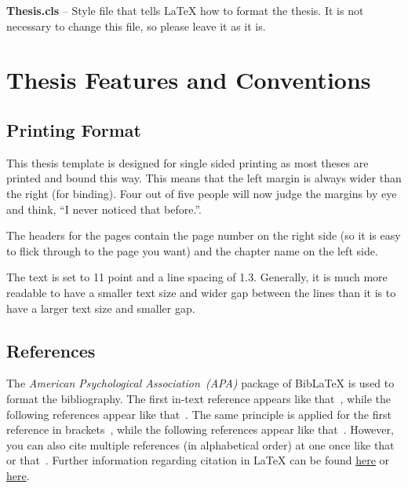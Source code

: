 \textbf{Thesis.cls} -- Style file that tells \LaTeX{} how to format the thesis. It is not necessary to change this file, so please leave it as it is.


\section{Thesis Features and Conventions}
\label{ThesisConventions}

\subsection{Printing Format}

This thesis template is designed for single sided printing as most theses are printed and bound this way. This means that the left margin is always wider than the right (for binding). Four out of five people will now judge the margins by eye and think, ``I never 
noticed that before.''.

The headers for the pages contain the page number on the right side (so it is easy to flick through to the page you want) and the chapter name on the left side.

The text is set to 11 point and a line spacing of 1.3. Generally, it is much more readable to have a smaller text size and wider gap between the lines than it is to have a larger text size and smaller gap.

\subsection{References}

The \textit{American Psychological Association~(APA)} package of BibLaTeX is used to format the bibliography. The first in-text reference appears like that~\textcite{Reference1}, while the following references appear like that~\textcite{Reference1}. The same principle is applied for the first reference in brackets~\parencite{Reference3}, while the following references appear like that~\parencite{Reference3}. However, you can also cite multiple references (in alphabetical order) at one once like that~\textcite{Reference1,Reference2} or that~\parencite{Reference1,Reference2}. Further information regarding citation in LaTeX{} can be found \href{http://en.wikibooks.org/wiki/LaTeX/Bibliography_Management}{here} or \href{http://www.ctan.org/pkg/apa6}{here}.


